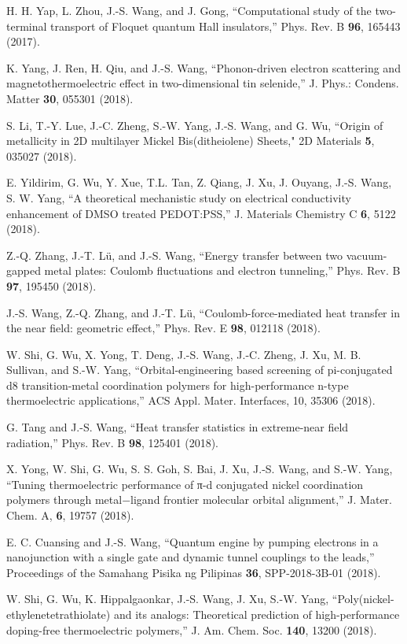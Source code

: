 \itm H. H. Yap, L. Zhou, J.-S. Wang, and J. Gong,
 ``Computational study of the two-terminal transport of Floquet quantum Hall insulators,''
Phys. Rev. B {\bf 96}, 165443 (2017). 

\itm K. Yang, J. Ren, H. Qiu, and J.-S. Wang,
 ``Phonon-driven electron scattering and magnetothermoelectric effect in two-dimensional tin selenide,'' 
J. Phys.: Condens. Matter {\bf 30}, 055301 (2018). 

\itm S. Li, T.-Y. Lue, J.-C. Zheng, S.-W. Yang, J.-S. Wang, and G. Wu,
``Origin of metallicity in 2D multilayer Mickel Bis(ditheiolene) Sheets,"
2D Materials {\bf 5}, 035027 (2018). 

\itm E. Yildirim, G. Wu, Y. Xue, T.L. Tan, Z. Qiang, J. Xu, J. Ouyang, J.-S. Wang, S. W. Yang,
``A theoretical mechanistic study on electrical conductivity enhancement of DMSO treated PEDOT:PSS,'' 
J. Materials Chemistry C {\bf 6}, 5122 (2018). 

\itm Z.-Q. Zhang, J.-T. L\"u, and J.-S. Wang, 
``Energy transfer between two vacuum-gapped metal plates: Coulomb fluctuations and electron tunneling,'' 
Phys. Rev. B {\bf 97}, 195450 (2018). 

\itm J.-S. Wang, Z.-Q. Zhang, and J.-T. L\"u, 
``Coulomb-force-mediated heat transfer in the near field:  geometric effect,'' 
Phys. Rev. E {\bf 98}, 012118 (2018). 

\itm W. Shi, G. Wu, X. Yong, T. Deng, J.-S. Wang, J.-C. Zheng, J. Xu, M. B. Sullivan, and S.-W. Yang,
 ``Orbital-engineering based screening of pi-conjugated d8 transition-metal coordination polymers for high-performance 
 n-type thermoelectric applications,'' ACS Appl. Mater. Interfaces, {10}, 35306 (2018). 

\itm G. Tang and J.-S. Wang, ``Heat transfer statistics in extreme-near field radiation,'' 
Phys. Rev. B {\bf 98}, 125401 (2018). 

\itm X. Yong, W. Shi, G. Wu, S. S. Goh, S. Bai, J. Xu, J.-S. Wang, and S.-W. Yang,
 ``Tuning thermoelectric performance of π-d conjugated nickel coordination polymers through 
 metal−ligand frontier molecular orbital alignment,'' J. Mater. Chem. A, 
{\bf 6}, 19757 (2018).

\itm E. C. Cuansing and J.-S. Wang, 
``Quantum engine by pumping electrons in a nanojunction with a single gate and dynamic tunnel couplings to the leads,'' 
Proceedings of the Samahang Pisika ng Pilipinas {\bf 36}, SPP-2018-3B-01 (2018). 

\itm W. Shi, G. Wu, K. Hippalgaonkar, J.-S. Wang, J. Xu, S.-W. Yang, 
``Poly(nickel-ethylenetetrathiolate) and its analogs: Theoretical prediction of high-performance doping-free thermoelectric polymers,'' 
J. Am. Chem. Soc. {\bf 140}, 13200 (2018). 

